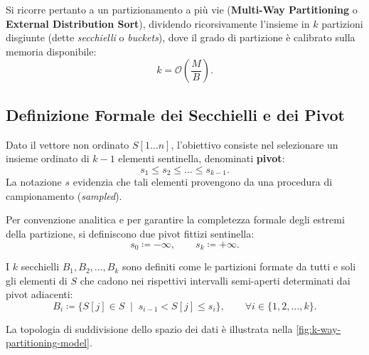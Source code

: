 Si ricorre pertanto a un partizionamento a più vie (\textbf{Multi-Way Partitioning} o \textbf{External Distribution Sort}), dividendo ricorsivamente l'insieme in $k$ partizioni disgiunte (dette \textit{secchielli} o \textit{buckets}), dove il grado di partizione è calibrato sulla memoria disponibile:
\begin{equation}
  k = \mathcal{O}\left(\frac{M}{B}\right).
\end{equation}

\FloatBarrier
\subsection{Definizione Formale dei Secchielli e dei Pivot}
Dato il vettore non ordinato $S[1 \dots n]$, l'obiettivo consiste nel selezionare un insieme ordinato di $k - 1$ elementi sentinella, denominati \textbf{pivot}:
\begin{equation}
  s_1 \le s_2 \le \dots \le s_{k-1}.
\end{equation}
La notazione $s$ evidenzia che tali elementi provengono da una procedura di campionamento (\textit{sampled}).

Per convenzione analitica e per garantire la completezza formale degli estremi della partizione, si definiscono due pivot fittizi sentinella:
\begin{equation}
  s_0 \coloneqq -\infty, \qquad s_k \coloneqq +\infty.
\end{equation}

\begin{definition}
I $k$ secchielli $B_1, B_2, \dots, B_k$ sono definiti come le partizioni formate da tutti e soli gli elementi di $S$ che cadono nei rispettivi intervalli semi-aperti determinati dai pivot adiacenti:
\begin{equation}
  B_i \coloneqq \Big\{ S[j] \in S \;\mid\; s_{i-1} < S[j] \le s_i \Big\}, \qquad \forall i \in \{1, 2, \dots, k\}.
  \label{eq:bucket-formal-def}
\end{equation}
\end{definition}

La topologia di suddivisione dello spazio dei dati è illustrata nella \autoref{fig:k-way-partitioning-model}.

